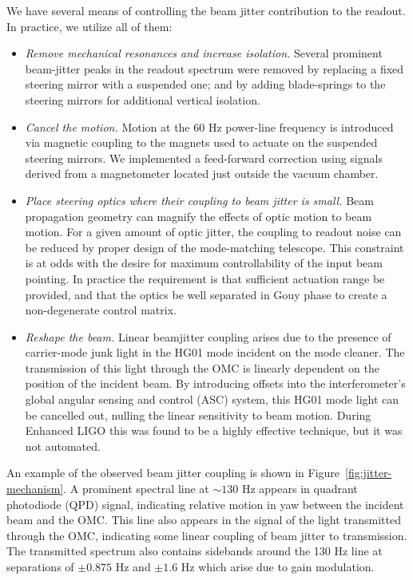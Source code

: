We have several means of controlling the beam jitter contribution to the
readout.  In practice, we utilize all of them:

\begin{itemize}
\item \emph{Remove mechanical resonances and increase isolation.}  Several
  prominent beam-jitter peaks in the readout spectrum were removed by
  replacing a fixed steering mirror with a suspended one; and by
  adding blade-springs to the steering mirrors for additional vertical isolation.

\item \emph{Cancel the motion.}  Motion at the 60 Hz power-line
  frequency is introduced via magnetic coupling to the magnets used to
  actuate on the suspended steering mirrors.  We implemented a feed-forward
  correction using signals derived from a magnetometer located just outside
  the vacuum chamber.

\item \emph{Place steering optics where their coupling to beam jitter
  is small.}
  Beam propagation geometry can magnify the effects of optic motion to 
  beam motion.
  For a given amount of optic jitter, the coupling to readout noise can
  be reduced by proper design of the mode-matching telescope.
  This constraint is at odds with the desire for maximum controllability
  of the input beam pointing.  
  In practice the requirement is that sufficient actuation range be 
  provided, and that the optics be well separated in Gouy phase to
  create a non-degenerate control matrix.

\item \emph{Reshape the beam.}  Linear beamjitter coupling arises due
  to the presence of carrier-mode junk light in the HG01 mode incident
  on the mode cleaner.  The transmission of this light through the OMC
  is linearly dependent on the position of the incident beam.  By
  introducing offsets into the interferometer's global angular sensing
  and control (ASC) system\cite{Barsotti2010Alignment}, this HG01 mode light can be cancelled out,
  nulling the linear sensitivity to beam motion.
  During Enhanced LIGO this was found to be a highly effective
  technique, but it was not automated.
\end{itemize}

An example of the observed beam jitter coupling is shown in
Figure~\ref{fig:jitter-mechanism}.  A prominent spectral line at
$\sim130$ Hz appears in quadrant photodiode (QPD) signal, indicating
relative motion in yaw between the incident beam and the OMC.  This
line also appears in the signal of the light transmitted through the
OMC, indicating some linear coupling of beam jitter to transmission.
The transmitted spectrum also contains sidebands around the 130 Hz
line at separations of $\pm0.875$ Hz and $\pm1.6$ Hz which arise due
to gain modulation.

